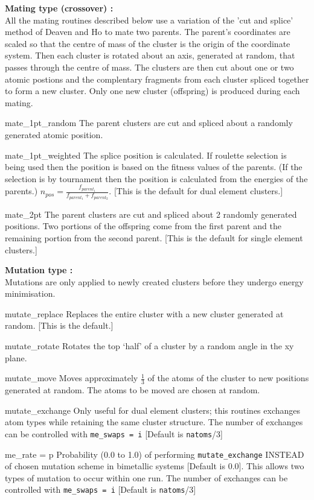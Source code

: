\documentclass[12pt,a4paper]{article}
\newenvironment{entry}[1]
{\begin{list}{}{\renewcommand{\makelabel}[1]{~~\texttt{##1 :}\hfil}
      \setlength{\labelwidth}{90pt}
      \setlength{\leftmargin}{\labelwidth+\labelsep}}}
{\end{list}}
\begin{document}
\noindent \textbf{Mating type (crossover) :} ~\\ [1ex]
All the mating routines described below use a variation of the 'cut and splice' method of Deaven and Ho to mate two parents. The parent's coordinates are scaled so that the centre of mass of the cluster is the origin of the coordinate system. Then each cluster is rotated about an axis, generated at random, that passes through the centre of mass. The clusters are then cut about one or two atomic postions and the complentary fragments from each cluster spliced together to form a new cluster. Only one new cluster (offspring) is produced during each mating.
\begin{entry}{a}
\item[mate\_1pt\_random] The parent clusters are cut and spliced about a randomly generated atomic position.
\item[mate\_1pt\_weighted] The splice position is calculated. If roulette selection is being used then the position is based on the fitness values of the parents. (If the selection is by tournament then the position is calculated from the energies of the parents.)
$n_{pos}=\frac{f_{parent_1}}{f_{parent_1}+f_{parent_2}}$. [This is the default for dual element clusters.]
\item[mate\_2pt] The parent clusters are cut and spliced about 2 randomly generated positions. Two portions of the offspring come from the first parent and the remaining portion from the second parent. [This is the default for single element clusters.]
\end{entry}

\noindent \textbf{Mutation type :} ~\\ [1ex]
Mutations are only applied to newly created clusters before they undergo energy minimisation.
\begin{entry}{a}
\item[mutate\_replace] Replaces the entire cluster with a new cluster generated at random. [This is the default.]
\item[mutate\_rotate] Rotates the top `half' of a cluster by a random angle in the xy plane.
\item[mutate\_move] Moves approximately $\frac{1}{3}$ of the atoms of the cluster to new positions generated at random. The atoms to be moved are chosen at random.
\item[mutate\_exchange] Only useful for dual element clusters; this routines exchanges atom types while retaining the same cluster structure. The number of exchanges can be controlled with \texttt{me\_swaps = i} [Default is \texttt{natoms}/3]
\item[me\_rate = p] Probability (0.0 to 1.0) of performing \texttt{mutate\_exchange} INSTEAD of chosen mutation scheme in bimetallic systems [Default is 0.0]. This allows two types of mutation to occur within one run. The number of exchanges can be controlled with \texttt{me\_swaps = i} [Default is \texttt{natoms}/3] 
\end{entry}
\end{document}
